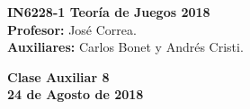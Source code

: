 \documentclass[11pt, spanish]{article}
\theoremstyle{plain}
\begin{document}

\begin{flushleft}
  \textbf{IN6228-1 Teoría de Juegos 2018}
  \\\textbf{Profesor:} José Correa.
  \\\textbf{Auxiliares:} Carlos Bonet y Andrés Cristi.
\end{flushleft}


\begin{center}
  \large{\textbf{Clase Auxiliar 8\\ 24 de Agosto de 2018}}
\end{center}

\end{document}

